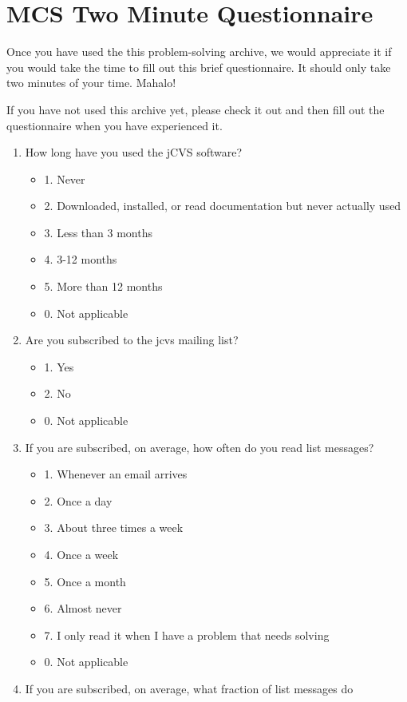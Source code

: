 \section{MCS Two Minute Questionnaire}
Once you have used the this problem-solving archive, we would appreciate it if
you would take the time to fill out this brief questionnaire. It should only
take two minutes of your time. Mahalo!

If you have not used this archive yet, please check it out and then fill out
the questionnaire when you have experienced it.

\begin{enumerate}
\item How long have you used the jCVS software?
  \begin{itemize}
  \item 1. Never
  \item 2. Downloaded, installed, or read documentation but never actually used
  \item 3. Less than 3 months
  \item 4. 3-12 months
  \item 5. More than 12 months
  \item 0. Not applicable
  \end{itemize}
\item Are you subscribed to the jcvs mailing list?
  \begin{itemize}
  \item 1. Yes
  \item 2. No
  \item 0. Not applicable
  \end{itemize}  
\item If you are subscribed, on average, how often do you read list messages?
  \begin{itemize}
  \item 1. Whenever an email arrives
  \item 2. Once a day
  \item 3. About three times a week
  \item 4. Once a week
  \item 5. Once a month
  \item 6. Almost never
  \item 7. I only read it when I have a problem that needs solving
  \item 0. Not applicable
  \end{itemize}
\item If you are subscribed, on average, what fraction of list messages do

\end{enumerate}
